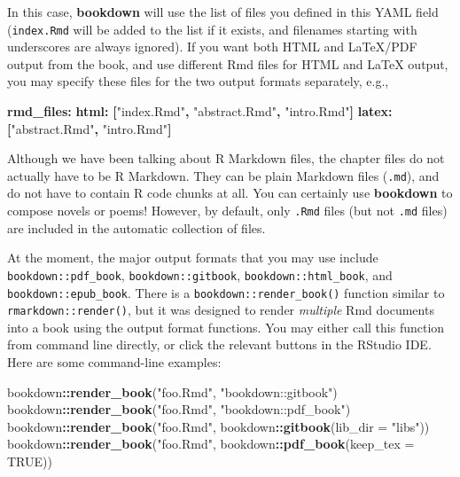 \documentclass[
  12pt,
]{krantz}
\newenvironment{Shaded}{\begin{snugshade}}{\end{snugshade}}
\newcommand{\AttributeTok}[1]{\textcolor[rgb]{0.13,0.29,0.53}{#1}}
\newcommand{\ConstantTok}[1]{\textcolor[rgb]{0.56,0.35,0.01}{#1}}
\newcommand{\FunctionTok}[1]{\textcolor[rgb]{0.13,0.29,0.53}{\textbf{#1}}}
\newcommand{\KeywordTok}[1]{\textcolor[rgb]{0.13,0.29,0.53}{\textbf{#1}}}
\newcommand{\NormalTok}[1]{#1}
\newcommand{\SpecialCharTok}[1]{\textcolor[rgb]{0.81,0.36,0.00}{\textbf{#1}}}
\newcommand{\StringTok}[1]{\textcolor[rgb]{0.31,0.60,0.02}{#1}}
\theoremstyle{definition}
\theoremstyle{definition}
\theoremstyle{definition}
\theoremstyle{definition}
\theoremstyle{remark}
\begin{document}
In this case, \textbf{bookdown} will use the list of files you defined in this YAML field (\texttt{index.Rmd} will be added to the list if it exists, and filenames starting with underscores are always ignored). If you want both HTML and LaTeX/PDF output from the book, and use different Rmd files for HTML and LaTeX output, you may specify these files for the two output formats separately, e.g.,

\begin{Shaded}
\begin{Highlighting}[]
\FunctionTok{rmd\_files}\KeywordTok{:}
\AttributeTok{  }\FunctionTok{html}\KeywordTok{:}\AttributeTok{ }\KeywordTok{[}\StringTok{"index.Rmd"}\KeywordTok{,}\AttributeTok{ }\StringTok{"abstract.Rmd"}\KeywordTok{,}\AttributeTok{ }\StringTok{"intro.Rmd"}\KeywordTok{]}
\AttributeTok{  }\FunctionTok{latex}\KeywordTok{:}\AttributeTok{ }\KeywordTok{[}\StringTok{"abstract.Rmd"}\KeywordTok{,}\AttributeTok{ }\StringTok{"intro.Rmd"}\KeywordTok{]}
\end{Highlighting}
\end{Shaded}

Although we have been talking about R Markdown files, the chapter files do not actually have to be R Markdown. They can be plain Markdown files (\texttt{.md}), and do not have to contain R code chunks at all. You can certainly use \textbf{bookdown} to compose novels or poems!
However, by default, only \texttt{.Rmd} files (but not \texttt{.md} files) are included in the automatic collection of files.

At the moment, the major output formats that you may use include \texttt{bookdown::pdf\_book}, \texttt{bookdown::gitbook}, \texttt{bookdown::html\_book}, and \texttt{bookdown::epub\_book}. There is a \texttt{bookdown::render\_book()} function similar to \texttt{rmarkdown::render()}, but it was designed to render \emph{multiple} Rmd documents into a book using the output format functions. You may either call this function from command line directly, or click the relevant buttons in the RStudio IDE. Here are some command-line examples:

\begin{Shaded}
\begin{Highlighting}[]
\NormalTok{bookdown}\SpecialCharTok{::}\FunctionTok{render\_book}\NormalTok{(}\StringTok{"foo.Rmd"}\NormalTok{, }\StringTok{"bookdown::gitbook"}\NormalTok{)}
\NormalTok{bookdown}\SpecialCharTok{::}\FunctionTok{render\_book}\NormalTok{(}\StringTok{"foo.Rmd"}\NormalTok{, }\StringTok{"bookdown::pdf\_book"}\NormalTok{)}
\NormalTok{bookdown}\SpecialCharTok{::}\FunctionTok{render\_book}\NormalTok{(}\StringTok{"foo.Rmd"}\NormalTok{, bookdown}\SpecialCharTok{::}\FunctionTok{gitbook}\NormalTok{(}\AttributeTok{lib\_dir =} \StringTok{"libs"}\NormalTok{))}
\NormalTok{bookdown}\SpecialCharTok{::}\FunctionTok{render\_book}\NormalTok{(}\StringTok{"foo.Rmd"}\NormalTok{, bookdown}\SpecialCharTok{::}\FunctionTok{pdf\_book}\NormalTok{(}\AttributeTok{keep\_tex =} \ConstantTok{TRUE}\NormalTok{))}
\end{Highlighting}
\end{Shaded}
\end{document}
